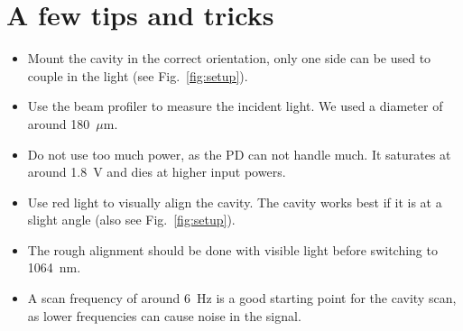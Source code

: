 \section{A few tips and tricks}
\begin{itemize}
    \item Mount the cavity in the correct orientation, only one side can be used to couple in the light (see Fig.~\ref{fig:setup}).
    \item Use the beam profiler to measure the incident light. We used a diameter of around 180~$\mu$m.
    \item Do not use too much power, as the PD can not handle much. It saturates at around 1.8~V and dies at higher input powers.
    \item Use red light to visually align the cavity. The cavity works best if it is at a slight angle (also see Fig.~\ref{fig:setup}).
    \item The rough alignment should be done with visible light before switching to 1064~nm.
    \item A scan frequency of around 6~Hz is a good starting point for the cavity scan, as lower frequencies can cause noise in the signal.
\end{itemize}

